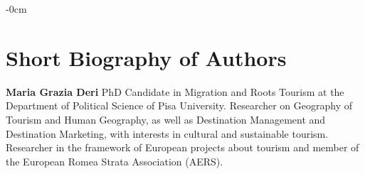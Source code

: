 \documentclass[sustainability,article,submit,pdftex,moreauthors]{Definitions/mdpi}
\begin{document}
\begin{adjustwidth}{-\extralength}{0cm}






\section*{Short Biography of Authors}
\bio
{}
{\textbf{Maria Grazia Deri} PhD Candidate in Migration and Roots Tourism at the Department of Political Science of Pisa University. Researcher on Geography of Tourism and Human Geography, as well as Destination Management and Destination Marketing, with interests in cultural and sustainable tourism. Researcher in the framework of European projects about tourism and member of the European Romea Strata Association (AERS).}


\end{adjustwidth}
\end{document}
